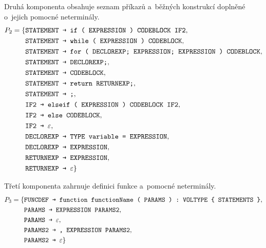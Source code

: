 Druhá komponenta obsahuje seznam příkazů a~běžných konstrukcí doplněné o~jejich pomocné neterminály.
\begin{equation*}
    P_2 = \{ 
        \begin{aligned}[t] 
            &\texttt{STATEMENT \textrightarrow{} } \texttt{if ( EXPRESSION ) CODEBLOCK IF2},\\
            &\texttt{STATEMENT \textrightarrow{} } \texttt{while ( EXPRESSION ) CODEBLOCK},\\
            &\texttt{STATEMENT \textrightarrow{} } \texttt{for ( DECLOREXP; EXPRESSION; EXPRESSION ) CODEBLOCK},\\
            &\texttt{STATEMENT \textrightarrow{} } \texttt{DECLOREXP;},\\
            &\texttt{STATEMENT \textrightarrow{} } \texttt{CODEBLOCK},\\
            &\texttt{STATEMENT \textrightarrow{} } \texttt{return RETURNEXP;},\\
            &\texttt{STATEMENT \textrightarrow{} } \texttt{;},\\
            &\texttt{IF2 \textrightarrow{} } \texttt{elseif ( EXPRESSION ) CODEBLOCK IF2},\\
            &\texttt{IF2 \textrightarrow{} } \texttt{else CODEBLOCK},\\
            &\texttt{IF2 \textrightarrow{} } \varepsilon,\\
            &\texttt{DECLOREXP \textrightarrow{} } \texttt{TYPE variable = EXPRESSION},\\
            &\texttt{DECLOREXP \textrightarrow{} } \texttt{EXPRESSION},\\
            &\texttt{RETURNEXP \textrightarrow{} } \texttt{EXPRESSION},\\
            &\texttt{RETURNEXP \textrightarrow{} } \varepsilon\} 
        \end{aligned}
\end{equation*}


Třetí komponenta zahrnuje definici funkce a~pomocné neterminály.
\begin{equation*}
    P_3 = \{ 
        \begin{aligned}[t] 
            &\texttt{FUNCDEF \textrightarrow{} } \texttt{function functionName ( PARAMS ) : VOLTYPE \{ STATEMENTS \}},\\
            &\texttt{PARAMS \textrightarrow{} } \texttt{EXPRESSION PARAMS2}, \\
            &\texttt{PARAMS \textrightarrow{} } \varepsilon,\\
            &\texttt{PARAMS2 \textrightarrow{} } \texttt{, EXPRESSION PARAMS2},\\
            &\texttt{PARAMS2 \textrightarrow{} } \varepsilon \}
        \end{aligned}
\end{equation*}

